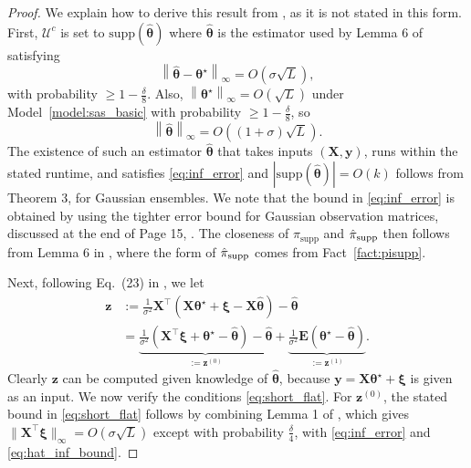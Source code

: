 \documentclass[11pt]{article}
\newcommand{\defeq}{:=}
\newcommand{\norm}[1]{\left\lVert#1\right\rVert}
\newcommand{\norms}[1]{\lVert#1\rVert}
\newcommand{\1}{\mathbf{1}}
\newcommand{\0}{\mathbf{0}}
\newcommand{\Par}[1]{\left(#1\right)}
\newcommand{\supp}{\mathrm{supp}}
\newcommand{\vth}{\boldsymbol{\theta}}
\newcommand{\vxi}{\boldsymbol{\xi}}
\newcommand{\sig}{\sigma}
\newcommand{\vths}{\vth^\star}
\newcommand{\vhth}{\widehat{\vth}}
\newcommand{\pisupp}{\pi_{\supp}}
\newcommand{\hpi}{\hat{\pi}}
\newcommand{\hpisupp}{\hpi_{\textup{supp}}}
\newcommand{\me}{{\mathbf{E}}}
\newcommand{\mx}{{\mathbf{X}}}
\newcommand{\vy}{{\mathbf{y}}}
\newcommand{\vz}{{\mathbf{z}}}
\newcommand{\calU}{{\mathcal{U}}}
\begin{document}
\begin{proof}
We explain how to derive this result from \cite{KumarSTZ25, ChenLTZ26}, as it is not stated in this form. First, $\calU^c$ is set to $\supp(\vhth)$ where $\vhth$ is the estimator used by Lemma 6 of \cite{KumarSTZ25} satisfying
\begin{equation}\label{eq:inf_error}
    \norm{\vhth - \vths}_\infty = O\Par{\sig \sqrt{L}},
\end{equation}
with probability $\ge 1 - \frac \delta 8$. Also, $\norm{\vths}_\infty = O(\sqrt{L})$ under Model~\ref{model:sas_basic} with probability $\ge 1 - \frac \delta 8$, so
\begin{equation}\label{eq:hat_inf_bound}
\norm{\vhth}_\infty = O\Par{(1 + \sig)\sqrt L}.
\end{equation}
The existence of such an estimator $\vhth$ that takes inputs $(\mx, \vy)$, runs within the stated runtime, and satisfies \eqref{eq:inf_error} and $|\supp(\vhth)| = O(k)$ follows from Theorem 3, \cite{ChenLTZ26} for Gaussian ensembles. We note that the bound in \eqref{eq:inf_error} is obtained by using the tighter error bound for Gaussian observation matrices, discussed at the end of Page 15, \cite{ChenLTZ26}. 
The closeness of $\pisupp$ and $\hpisupp$ then follows from Lemma 6 in \cite{KumarSTZ25}, where the form of $\hpisupp$ comes from Fact~\ref{fact:pisupp}. 

Next, following Eq.\ (23) in \cite{KumarSTZ25}, we let
\begin{align*}
\vz &\defeq \frac 1 {\sig^2} \mx^\top\Par{\mx\vths + \vxi - \mx \vhth} - \vhth \\
&= \underbrace{\frac 1 {\sig^2}\Par{ \mx^\top \vxi + \vths - \vhth} - \vhth}_{\defeq \vz^{(0)}} + \underbrace{\frac 1 {\sig^2}\me \Par{\vths - \vhth}}_{\defeq \vz^{(1)}}.
\end{align*}
Clearly $\vz$ can be computed given knowledge of $\vhth$, because $\vy = \mx \vths + \vxi$ is given as an input. We now verify the conditions \eqref{eq:short_flat}. For $\vz^{(0)}$, the stated bound in \eqref{eq:short_flat} follows by combining Lemma 1 of \cite{KumarSTZ25}, which gives $\norms{\mx^\top \vxi}_\infty = O(\sig \sqrt{L})$ except with probability $\frac \delta 4$, with \eqref{eq:inf_error} and \eqref{eq:hat_inf_bound}. 


\end{proof}
\end{document}
